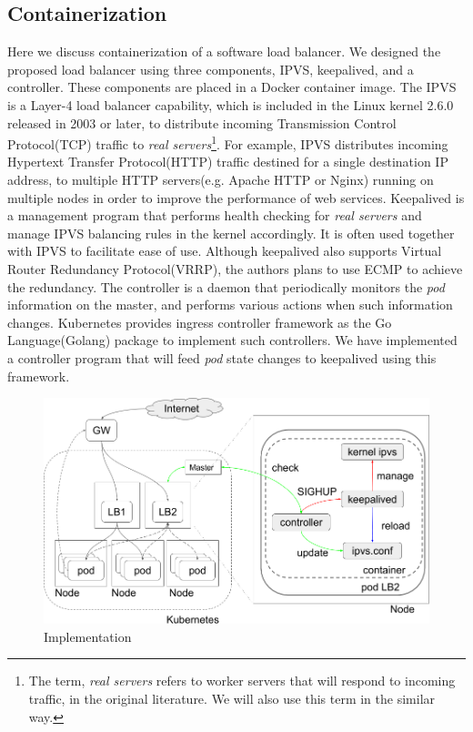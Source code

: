 \subsection{Containerization}\label{IPVS}

Here we discuss containerization of a software load balancer.
We designed the proposed load balancer using three components, IPVS, keepalived, and a controller. 
These components are placed in a Docker container image.
The IPVS is a Layer-4 load balancer capability, which is included in the Linux kernel 2.6.0 released in 2003 or later, 
to distribute incoming Transmission Control Protocol(TCP) traffic to 
{\em real servers}\footnote{The term, {\em real servers} refers to worker servers that will respond to incoming traffic, 
in the original literature\cite{Zhang2000}. We will also use this term in the similar way.}\cite{Zhang2000}. 
For example, IPVS distributes incoming Hypertext Transfer Protocol(HTTP) traffic destined for a single destination IP address, 
to multiple HTTP servers(e.g. Apache HTTP or Nginx) running on multiple nodes in order to improve the performance of web services.
Keepalived is a management program that performs health checking for {\em real servers}
and manage IPVS balancing rules in the kernel accordingly.
It is often used together with IPVS to facilitate ease of use.
Although keepalived also supports Virtual Router Redundancy Protocol(VRRP)\cite{hinden2004virtual}, the authors plans to use ECMP to achieve the redundancy.
The controller is a daemon that periodically monitors the {\em pod} information on the master, 
and performs various actions when such information changes.
Kubernetes provides ingress controller framework as the Go Language(Golang) package to implement such controllers. 
We have implemented a controller program that will feed {\em pod} state changes to keepalived 
using this framework. 

\begin{figure}
\includegraphics[width=\columnwidth]{Figs/ipvs-ingress-schem}
\caption{Implementation}
\label{fig:IPVS-ingress-schem}
\end{figure}

